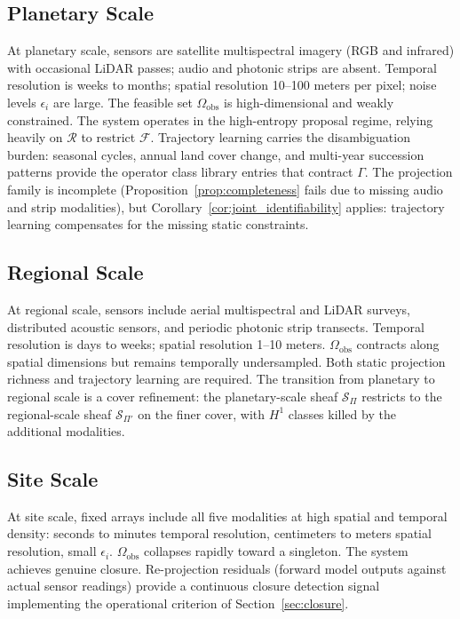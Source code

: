 \documentclass[12pt, oneside]{article}
\begin{document}
\subsection{Planetary Scale}

At planetary scale, sensors are satellite multispectral imagery (RGB and infrared) with
occasional LiDAR passes; audio and photonic strips are absent. Temporal resolution is
weeks to months; spatial resolution 10--100 meters per pixel; noise levels $\epsilon_i$
are large. The feasible set $\Omega_{\mathrm{obs}}$ is high-dimensional and weakly
constrained. The system operates in the high-entropy proposal regime, relying heavily on
$\mathcal{R}$ to restrict $\mathcal{F}$. Trajectory learning carries the disambiguation
burden: seasonal cycles, annual land cover change, and multi-year succession patterns
provide the operator class library entries that contract $\Gamma$. The projection family
is incomplete (Proposition~\ref{prop:completeness} fails due to missing audio and strip
modalities), but Corollary~\ref{cor:joint_identifiability} applies: trajectory learning
compensates for the missing static constraints.

\subsection{Regional Scale}

At regional scale, sensors include aerial multispectral and LiDAR surveys, distributed
acoustic sensors, and periodic photonic strip transects. Temporal resolution is days to
weeks; spatial resolution 1--10 meters. $\Omega_{\mathrm{obs}}$ contracts along spatial
dimensions but remains temporally undersampled. Both static projection richness and
trajectory learning are required. The transition from planetary to regional scale is a
cover refinement: the planetary-scale sheaf $\mathcal{S}_\Pi$ restricts to the
regional-scale sheaf $\mathcal{S}_{\Pi'}$ on the finer cover, with $H^1$ classes killed
by the additional modalities.

\subsection{Site Scale}

At site scale, fixed arrays include all five modalities at high spatial and temporal
density: seconds to minutes temporal resolution, centimeters to meters spatial resolution,
small $\epsilon_i$. $\Omega_{\mathrm{obs}}$ collapses rapidly toward a singleton. The
system achieves genuine closure. Re-projection residuals (forward model outputs against
actual sensor readings) provide a continuous closure detection signal implementing the
operational criterion of Section~\ref{sec:closure}.
\end{document}
